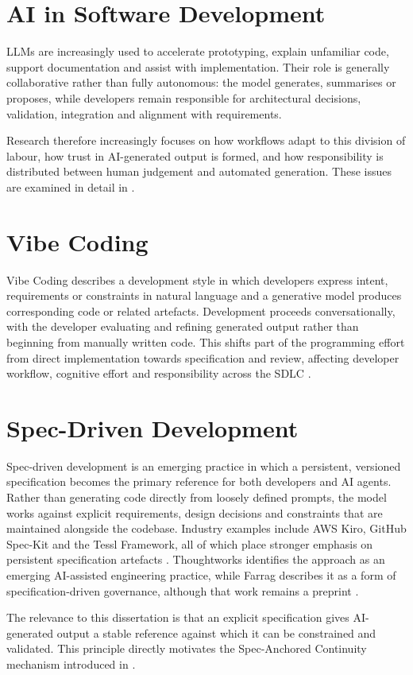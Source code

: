 \section{AI in Software Development}

LLMs are increasingly used to accelerate prototyping, explain unfamiliar code, support documentation and assist with implementation. Their role is generally collaborative rather than fully autonomous: the model generates, summarises or proposes, while developers remain responsible for architectural decisions, validation, integration and alignment with requirements.

Research therefore increasingly focuses on how workflows adapt to this division of labour, how trust in AI-generated output is formed, and how responsibility is distributed between human judgement and automated generation. These issues are examined in detail in  \cite{Ahmed:2025ai,Zhang:2025ea,Durrani:2024ad,Jabrw:2025ss,Banh:2025cf,Farhanna:2025eu,KarlovsKarlovskis:2024ga,Terragni:2025fa}.

\section{Vibe Coding}

Vibe Coding describes a development style in which developers express intent, requirements or constraints in natural language and a generative model produces corresponding code or related artefacts. Development proceeds conversationally, with the developer evaluating and refining generated output rather than beginning from manually written code. This shifts part of the programming effort from direct implementation towards specification and review, affecting developer workflow, cognitive effort and responsibility across the SDLC \cite{Moore:2025vc,Zamfiroiu:2025ec}.

\section{Spec-Driven Development}
\label{sec:background_sdd}

Spec-driven development is an emerging practice in which a persistent, versioned specification becomes the primary reference for both developers and AI agents. Rather than generating code directly from loosely defined prompts, the model works against explicit requirements, design decisions and constraints that are maintained alongside the codebase. Industry examples include AWS Kiro, GitHub Spec-Kit and the Tessl Framework, all of which place stronger emphasis on persistent specification artefacts \cite{Thoughtworks:2025SD}. Thoughtworks identifies the approach as an emerging AI-assisted engineering practice, while Farrag describes it as a form of specification-driven governance, although that work remains a preprint \cite{Thoughtworks:2025SD,Farrag:2026sd}.

The relevance to this dissertation is that an explicit specification gives AI-generated output a stable reference against which it can be constrained and validated. This principle directly motivates the Spec-Anchored Continuity mechanism introduced in .